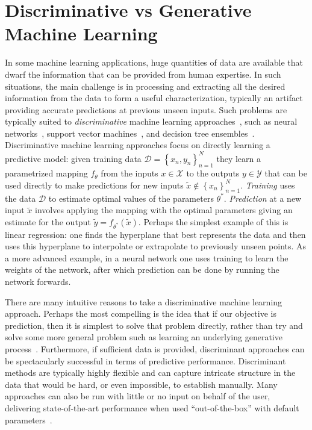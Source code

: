 
\section{Discriminative vs Generative Machine Learning}
\label{sec:bayes:discrim}

In some machine learning applications, huge quantities of data are available that dwarf the information
that can be provided from human expertise.  In such situations, the main challenge is in processing
and extracting all the desired information from the data to form a useful characterization,
typically an artifact providing accurate predictions at previous unseen inputs. 
Such problems are typically suited to \emph{discriminative} 
machine learning approaches~\citep{breiman2001statistical,vapnik1998statistical}, such as neural
networks~\citep{rumelhart1986learning,bishop1995neural}, 
support vector machines~\citep{cortes1995support,scholkopf2002learning}, and decision tree 
ensembles~\citep{breiman2001random,rainforth2015canonical}.  Discriminative machine learning approaches
focus on directly learning a predictive model: given training data $\mathcal{D} = \left\{x_n,y_n\right\}_{n=1}^N$
they learn a parametrized mapping $f_{\theta}$ from the inputs $x \in \mathcal{X}$ to the 
outputs $y\in\mathcal{Y}$ that can 
be used directly to make predictions 
for new inputs $\tilde{x} \notin \left\{x_n\right\}_{n=1}^N$.  \emph{Training}
uses the data $\mathcal{D}$ to estimate optimal values of the parameters $\theta^*$. \emph{Prediction}
at a new input $\tilde{x}$ involves applying the mapping with the optimal parameters giving an estimate for the output
$\tilde{y} = f_{\theta^*}(\tilde{x})$.  Perhaps the simplest example of this is linear regression: one finds
the hyperplane that best represents the data and then uses this hyperplane to interpolate or extrapolate
to previously unseen points.  
As a more advanced example, in a neural network one uses training to learn the
weights of the network, after which prediction can be done by running the network forwards.  

There are many intuitive reasons to take a discriminative machine learning 
approach.  Perhaps the most compelling is the
idea that if our objective is prediction, then it is simplest to solve that problem directly, rather
than try and solve some more general problem such as learning an underlying generative 
process~\citep{vapnik1998statistical,breiman2001statistical}. Furthermore, if sufficient
data is provided, discriminant approaches can be spectacularly successful in terms of predictive
performance.  Discriminant methods are typically highly flexible and can capture intricate structure in the data that
would be hard, or even impossible, to establish manually.  Many approaches can also be run with little
or no input on behalf of the user, delivering state-of-the-art performance when used
``out-of-the-box'' with default parameters~\citep{rainforth2015canonical}.  

